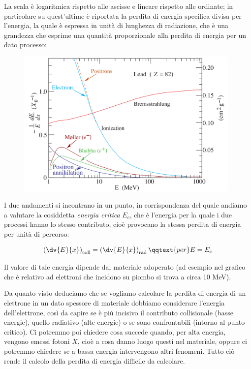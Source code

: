 La scala è logaritmica rispetto alle ascisse e lineare rispetto alle ordinate; in particolare su quest'ultime è riportata la perdita di energia specifica divisa per l'energia, la quale è espressa in unità di lunghezza di radiazione, che è una grandezza che esprime una quantità proporzionale alla perdita di energia per un dato processo:

\begin{figure}[H]
    \centering
    \includegraphics[width=11cm]{immagini/perdita_energia_elettroni.png}
\end{figure}

I due andamenti si incontrano in un punto, in corrispondenza del quale andiamo a valutare la cosiddetta \textit{energia critica} $E_c$, che è l'energia per la quale i due processi hanno lo stesso contributo, cioè provocano la stessa perdita di energia per unità di percorso:

\begin{equation*}
    \left(\dv{E}{x}\right)_{\rm coll}
    =\left(\dv{E}{x}\right)_{\rm rad}
    \qqtext{per}
    E=E_c
\end{equation*}

Il valore di tale energia dipende dal materiale adoperato (ad esempio nel grafico che è relativo ad elettroni che incidono su piombo si trova a circa 10 MeV).

Da quanto visto deduciamo che se vogliamo calcolare la perdita di energia di un elettrone in un dato spessore di materiale dobbiamo considerare l'energia dell'elettrone, così da capire se è più incisivo il contributo collisionale (basse energie), quello radiativo (alte energie) o se sono confrontabili (intorno al punto critico). Ci potremmo poi chiedere cosa succede quando, per alta energia, vengono emessi fotoni $X$, cioè a cosa danno luogo questi nel materiale, oppure ci potremmo chiedere se a bassa energia intervengono altri fenomeni. Tutto ciò rende il calcolo della perdita di energia difficile da calcolare.

